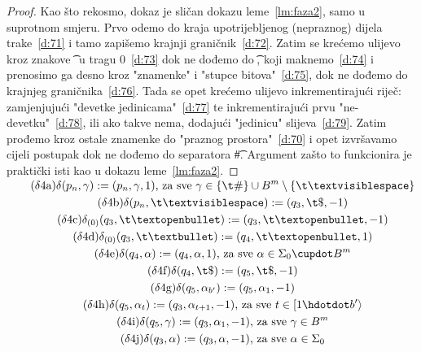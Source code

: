 \begin{proof}
Kao što rekosmo, dokaz je sličan dokazu leme~\ref{lm:faza2}, samo u suprotnom smjeru. Prvo odemo do kraja upotrijebljenog (nepraznog) dijela trake~\eqref{d:71} i tamo zapišemo krajnji graničnik~\eqref{d:72}. Zatim se krećemo ulijevo kroz znakove \t\textopenbullet\ u tragu $0$~\eqref{d:73} dok ne dođemo do \t\textbullet, koji maknemo~\eqref{d:74} i prenosimo ga desno kroz "znamenke" i "stupce bitova"~\eqref{d:75}, dok ne dođemo do krajnjeg graničnika~\eqref{d:76}. Tada se opet krećemo ulijevo inkrementirajući riječ: zamjenjujući "devetke jedinicama"~\eqref{d:77} te inkrementirajući prvu "ne-devetku"~\eqref{d:78}, ili ako takve nema, dodajući "jedinicu" slijeva~\eqref{d:79}. Zatim prođemo kroz ostale znamenke do "praznog prostora"~\eqref{d:70} i opet izvršavamo cijeli postupak dok ne dođemo do separatora \t\#.
Argument zašto to funkcionira je praktički isti kao u dokazu leme~\ref{lm:faza2}. %
\end{proof}
\noindent\begin{gather*}
\SwapAboveDisplaySkip
	\label{d:71}\tag{$\delta$4a}\delta(p_n,\gamma):=(p_n,\gamma,1)\text{, za sve } \gamma\in \{\t\#\}\cup B^m\setminus\{\bl\}\\
\label{d:72}\tag{$\delta$4b}\delta(p_n,\bl):=(q_3,\t\$,-1)\\
\label{d:73}\tag{$\delta$4c}\delta_{(0)}(q_3,\t\textopenbullet):=(q_3,\t\textopenbullet,-1)\\
\label{d:74}\tag{$\delta$4d}\delta_{(0)}(q_3,\t\textbullet):=(q_4,\t\textopenbullet,1)\\
\label{d:75}\tag{$\delta$4e}\delta(q_4,\alpha):=(q_4,\alpha,1)\text{, za sve }\alpha\in\Sigma_0\dcup B^m\\
\label{d:76}\tag{$\delta$4f}\delta(q_4,\t\$):=(q_5,\t\$,-1)\\
\label{d:77}\tag{$\delta$4g}\delta(q_5,\alpha_{b'}):=(q_5,\alpha_1,-1)\\
\label{d:78}\tag{$\delta$4h}\delta(q_5,\alpha_t):=(q_3,\alpha_{t+1},-1)\text{, za sve }t\in[1\dd b'\rangle\\
\label{d:79}\tag{$\delta$4i}\delta(q_5,\gamma):=(q_3,\alpha_1,-1)\text{, za sve }\gamma\in B^m\\
\label{d:70}\tag{$\delta$4j}\delta(q_3,\alpha):=(q_3,\alpha,-1)\text{, za sve }\alpha\in\Sigma_0
\end{gather*}

